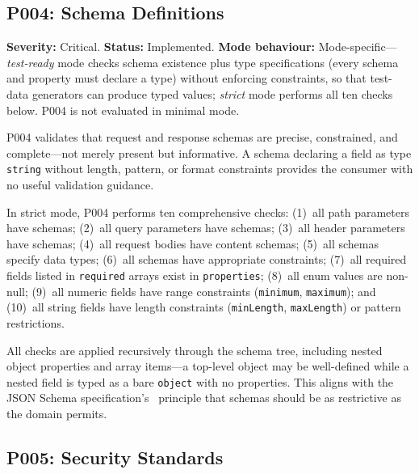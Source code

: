 \subsection{P004: Schema Definitions}
\label{subsec:p004}

\textbf{Severity:} Critical. \textbf{Status:} Implemented. \textbf{Mode behaviour:} Mode-specific---\textit{test-ready} mode checks schema existence plus type specifications (every schema and property must declare a type) without enforcing constraints, so that test-data generators can produce typed values; \textit{strict} mode performs all ten checks below. P004 is not evaluated in minimal mode.

P004 validates that request and response schemas are precise, constrained, and complete---not merely present but informative. A schema declaring a field as type \texttt{string} without length, pattern, or format constraints provides the consumer with no useful validation guidance.

In strict mode, P004 performs ten comprehensive checks: (1)~all path parameters have schemas; (2)~all query parameters have schemas; (3)~all header parameters have schemas; (4)~all request bodies have content schemas; (5)~all schemas specify data types; (6)~all schemas have appropriate constraints; (7)~all required fields listed in \texttt{required} arrays exist in \texttt{properties}; (8)~all enum values are non-null; (9)~all numeric fields have range constraints (\texttt{minimum}, \texttt{maximum}); and (10)~all string fields have length constraints (\texttt{minLength}, \texttt{maxLength}) or pattern restrictions.

All checks are applied recursively through the schema tree, including nested object properties and array items---a top-level object may be well-defined while a nested field is typed as a bare \texttt{object} with no properties. This aligns with the JSON Schema specification's~\cite{json-schema-2020} principle that schemas should be as restrictive as the domain permits.

\subsection{P005: Security Standards}
\label{subsec:p005}

